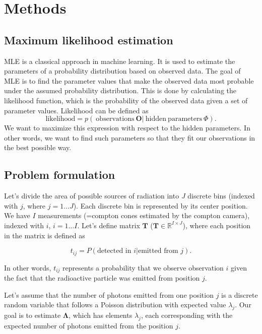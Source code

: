 
\chapter{Methods}

\section{Maximum likelihood estimation}
\ac{MLE} is a classical approach in machine learning.
It is used to estimate the parameters of a probability distribution based on observed data. 
The goal of \ac{MLE} is to find the parameter values that make the observed data most probable under the assumed probability distribution.
This is done by calculating the likelihood function, which is the probability of the observed data given a set of parameter values.
Likelihood can be defined as 
\begin{equation}
  \mathrm{likelihood} = p(\ \mathrm{observations } \  \boldsymbol{O} | \ \mathrm{hidden \ parameters\ } \Phi ).
  \label{eq:likelihood}
\end{equation}
We want to maximize this expression with respect to the hidden parameters.
In other words, we want to find such parameters so that they fit our observations in the best possible way.


\section{Problem formulation}
Let's divide the area of possible sources of radiation into $J$ discrete bins (indexed with $j$, where $j = 1 \dotsc J$).
Each discrete bin is represented by its center position.
We have $I$ measurements (=compton cones estimated by the compton camera), indexed with $i$, $i = 1 \dotsc I$.
Let's define matrix $\mathbf{T}$ ($\mathbf{T} \in \mathbb{R}^{I \times J}$), where each position in the matrix is defined as

\begin{equation}
  t_{ij} =  P(\textrm{detected in } i | \textrm{emitted from } j).
\end{equation}

In other words, $t_{ij}$ represents a probability that we observe observation $i$ given the fact that the radioactive particle was emitted from position $j$.

Let's assume that the number of photons emitted from one position $j$ is a discrete random variable that follows a Poisson distribution with expected value $\lambda_{j}$.
Our goal is to estimate $\mathbf{\Lambda}$, which has elements $\lambda_{j}$, each corresponding with the expected number of photons emitted from the position $j$.

